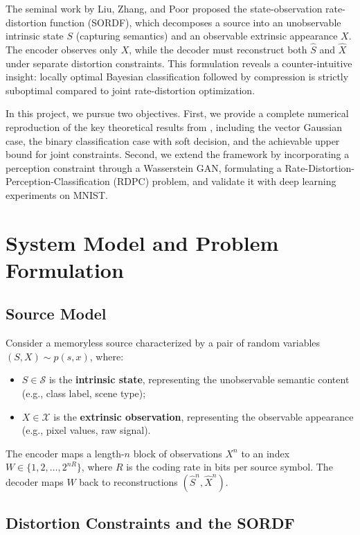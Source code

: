 \documentclass[conference]{IEEEtran}
\begin{document}
The seminal work by Liu, Zhang, and Poor \cite{liu2021rate} proposed the state-observation rate-distortion function (SORDF), which decomposes a source into an unobservable intrinsic state $S$ (capturing semantics) and an observable extrinsic appearance $X$. The encoder observes only $X$, while the decoder must reconstruct both $\hat{S}$ and $\hat{X}$ under separate distortion constraints. This formulation reveals a counter-intuitive insight: locally optimal Bayesian classification followed by compression is strictly suboptimal compared to joint rate-distortion optimization.

In this project, we pursue two objectives. First, we provide a complete numerical reproduction of the key theoretical results from \cite{liu2021rate}, including the vector Gaussian case, the binary classification case with soft decision, and the achievable upper bound for joint constraints. Second, we extend the framework by incorporating a perception constraint through a Wasserstein GAN, formulating a Rate-Distortion-Perception-Classification (RDPC) problem, and validate it with deep learning experiments on MNIST.

\section{System Model and Problem Formulation}

\subsection{Source Model}

Consider a memoryless source characterized by a pair of random variables $(S, X) \sim p(s, x)$, where:
\begin{itemize}
    \item $S \in \mathcal{S}$ is the \textbf{intrinsic state}, representing the unobservable semantic content (e.g., class label, scene type);
    \item $X \in \mathcal{X}$ is the \textbf{extrinsic observation}, representing the observable appearance (e.g., pixel values, raw signal).
\end{itemize}

The encoder maps a length-$n$ block of observations $X^n$ to an index $W \in \{1, 2, \dots, 2^{nR}\}$, where $R$ is the coding rate in bits per source symbol. The decoder maps $W$ back to reconstructions $(\hat{S}^n, \hat{X}^n)$.

\subsection{Distortion Constraints and the SORDF}
\end{document}
